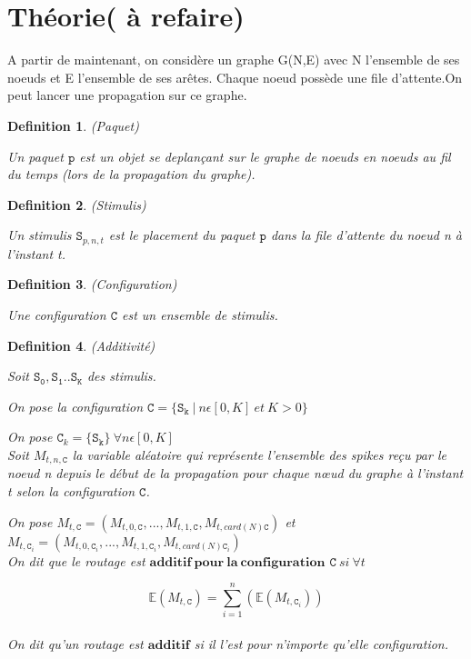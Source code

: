 \documentclass{report}
\newtheorem{mydef}{Definition}
\begin{document}
\section{Théorie( à refaire)}

A partir de maintenant, on considère un graphe G(N,E) avec N l'ensemble de ses noeuds et E l'ensemble de ses arêtes. Chaque noeud possède une file d'attente.On peut lancer une propagation sur ce graphe.

\begin{mydef}
(Paquet)

Un paquet $\mathtt{p}$ est un objet se deplançant sur le graphe de noeuds en noeuds au fil du temps (lors de la propagation du graphe).
\end{mydef}

\begin{mydef}
(Stimulis)

Un stimulis $\mathtt{S}_{p,n,t}$ est le placement du paquet $\mathtt{p}$ dans la file d'attente du noeud n à l'instant t.
\end{mydef}

\begin{mydef}
(Configuration)

Une configuration $\mathtt{C}$ est un ensemble de stimulis.
\end{mydef}

\begin{mydef}
(Additivité)

Soit $\mathtt{S_0},\mathtt{S_1} .. \mathtt{S_K}$ des stimulis.

On pose la configuration $\mathtt{C}=\{\mathtt{S_k}\ |\ n\epsilon[0,K]\ et\ K>0\}\  $ 

On pose $\mathtt{C}_k = \{\mathtt{S_k}\}\ \forall n\epsilon[0,K]$\\

Soit $M_{t,n,\mathtt{C}}$ la variable aléatoire qui représente l'ensemble des spikes reçu par le noeud n depuis le début de la propagation pour chaque nœud du graphe à l'instant t selon la configuration $\mathtt{C}$.

On pose $M_{t,\mathtt{C}}=(M_{t,0,\mathtt{C}},...,M_{t,1,\mathtt{C}},M_{t,card(N)\mathtt{C}})$ et $M_{t,\mathtt{C}_i}=(M_{t,0,\mathtt{C}_i},...,M_{t,1,\mathtt{C}_i},M_{t,card(N)\mathtt{C}_i})$ \\

On dit que le routage est $\mathbf{additif\ pour\ la\ configuration}$ $\mathtt{C}\ si\ \forall t$  

\[\mathbb{E} (M_{t,\mathtt{C}}) = \sum_{i=1}^{n} (\mathbb{E} (M_{t,\mathtt{C}_i})) \]\\

On dit qu'un routage est $\mathbf{additif}$ si il l'est pour n'importe qu'elle configuration.
\end{mydef}
\end{document}
